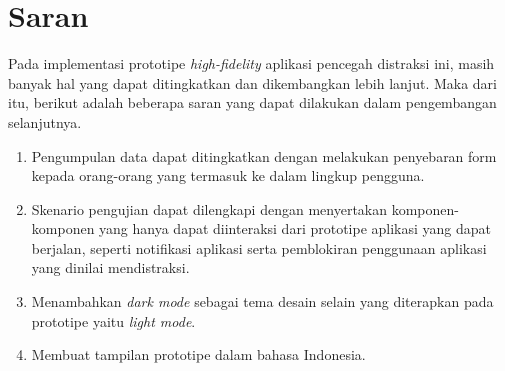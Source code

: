 \section{Saran}
Pada implementasi prototipe \textit{high-fidelity} aplikasi pencegah distraksi ini, masih banyak hal yang dapat ditingkatkan dan dikembangkan lebih lanjut. Maka dari itu, berikut adalah beberapa saran yang dapat dilakukan dalam pengembangan selanjutnya.

\begin{enumerate}
  \item Pengumpulan data dapat ditingkatkan dengan melakukan penyebaran form kepada orang-orang yang termasuk ke dalam lingkup pengguna.
  \item Skenario pengujian dapat dilengkapi dengan menyertakan komponen-komponen yang hanya dapat diinteraksi dari prototipe aplikasi yang dapat berjalan, seperti notifikasi aplikasi serta pemblokiran penggunaan aplikasi yang dinilai mendistraksi.
  \item Menambahkan \textit{dark mode} sebagai tema desain selain yang diterapkan pada prototipe yaitu \textit{light mode}.
  \item Membuat tampilan prototipe dalam bahasa Indonesia.
\end{enumerate}
